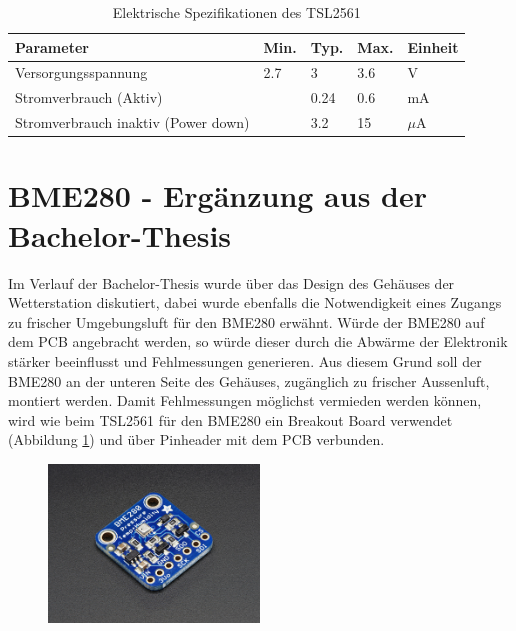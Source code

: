 \begin{table}[h]
  \centering
  \caption{Elektrische Spezifikationen des TSL2561 \cite{TSL2561}}
    \begin{tabular}{lllll}
    \toprule
    \textbf{Parameter} & \textbf{Min.} & \textbf{Typ.} & \textbf{Max.} & \textbf{Einheit} \\
    \midrule
    Versorgungsspannung & 2.7  & 3   & 3.6   & V \\
    Stromverbrauch (Aktiv) &       & 0.24   & 0.6   & mA \\
    Stromverbrauch inaktiv (Power down) &       & 3.2   & 15 & $\mu$A \\
    \bottomrule
    \end{tabular}%
  \label{tab:TSL2561}%
\end{table}%

\section{BME280 - Ergänzung aus der Bachelor-Thesis}
Im Verlauf der Bachelor-Thesis wurde über das Design des Gehäuses der Wetterstation diskutiert, dabei wurde ebenfalls die Notwendigkeit eines Zugangs zu frischer Umgebungsluft für den BME280 erwähnt. Würde der BME280 auf dem PCB angebracht werden, so würde dieser durch die Abwärme der Elektronik stärker beeinflusst und Fehlmessungen generieren. Aus diesem Grund soll der BME280 an der unteren Seite des Gehäuses, zugänglich zu frischer Aussenluft, montiert werden. Damit Fehlmessungen möglichst vermieden werden können, wird wie beim TSL2561 für den BME280 ein Breakout Board verwendet (Abbildung \ref{fig:BME_Breakout}) und über Pinheader mit dem PCB verbunden.\\

\begin{figure}[hbtp]
\centering
\includegraphics[width=0.5\textwidth]{graphics/BME280/BME280_Breakout.JPG}
\label{fig:BME_Breakout}
\end{figure}